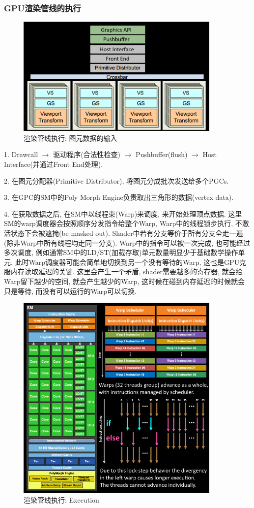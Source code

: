 \documentclass[UTF8]{ctexart}
\begin{document}
\subsubsection{GPU渲染管线的执行}
\begin{figure}[H]
  \includegraphics[width=10cm]{rendering_logic_0.png}
  \centering
  \caption{渲染管线执行: 图元数据的输入}
  \label{fig:rendering_pipeline_input}
\end{figure}

1. Drawcall $\to$ 驱动程序(合法性检查) $\to$ Pushbuffer(flush) $\to$ Host Interface(并通过Front End处理). 

2. 在图元分配器(Primitive Distributor), 将图元分成批次发送给多个PGCs.

3. 在GPC的SM中的Poly Morph Engine负责取出三角形的数据(vertex data).

4. 在获取数据之后, 在SM中以线程束(Warp)来调度, 来开始处理顶点数据. 这里SM的warp调度器会按照顺序分发指令给整个Warp, Warp中的线程锁步执行, 不激活状态下会被遮掩(be masked out). Shader中若有分支等价于所有分支全走一遍(除非Warp中所有线程均走同一分支). Warp中的指令可以被一次完成, 也可能经过多次调度, 例如通常SM中的LD/ST(加载存取)单元数量明显少于基础数学操作单元, 此时Warp调度器可能会简单地切换到另一个没有等待的Warp, 这也是GPU克服内存读取延迟的关键. 这里会产生一个矛盾, shader需要越多的寄存器, 就会给Warp留下越少的空间, 就会产生越少的Warp, 这时候在碰到内存延迟的时候就会只是等待, 而没有可以运行的Warp可以切换.

\begin{figure}[H]
  \includegraphics[width=10cm]{rendering_logic_1}
  \centering
  \caption{渲染管线执行: Execution}
  \label{fig:rendering_pipeline_shader_exec}
\end{figure}
\end{document}
